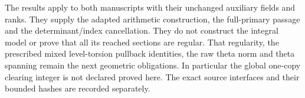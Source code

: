 The results apply to both manuscripts with their unchanged auxiliary
fields and ranks.  They supply the adapted arithmetic construction,
the full-primary passage and the determinant/index cancellation.
They do not construct the integral model or prove that all its reached
sections are regular.  That regularity, the prescribed mixed
level-torsion pullback identities, the raw theta norm and theta
spanning remain the next geometric obligations.  In particular the
global one-copy clearing integer is not declared proved here.
The exact source interfaces and their bounded hashes are recorded
separately\cite{primary-theta-source}.
